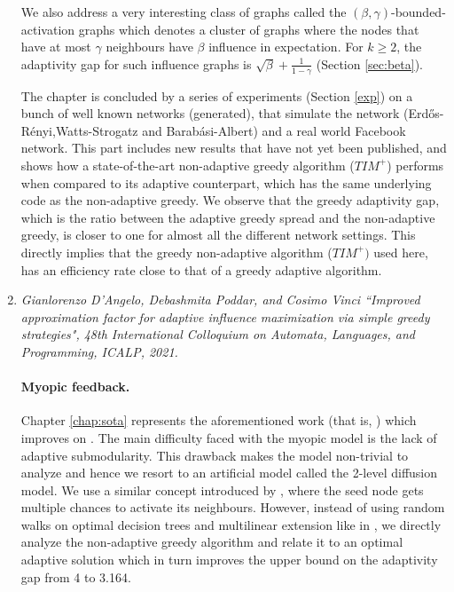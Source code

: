 \begin{enumerate}
We also address a very interesting class of graphs called the $(\beta,\gamma)$-bounded-activation graphs which denotes a cluster of graphs where the nodes that have at most $\gamma$ neighbours have $\beta$ influence in expectation. For $k \geq 2$, the adaptivity gap for such influence graphs is $\sqrt{\beta}+\frac{1}{1-\gamma}$ (Section \ref{sec:beta}).

The chapter is concluded by a series of experiments (Section \ref{exp}) on a bunch of well known networks (generated), that simulate the network (Erdős-Rényi,Watts-Strogatz and Barabási-Albert) and a real world Facebook network. This part includes new results that have not yet been published, and shows how a state-of-the-art non-adaptive greedy algorithm ($TIM^+$) performs when compared to its adaptive counterpart, which has the same underlying code as the non-adaptive greedy. We observe that the greedy adaptivity gap, which is the ratio between the adaptive greedy spread and the non-adaptive greedy, is closer to one for almost all the different network settings. This directly implies that the greedy non-adaptive algorithm ($TIM^+)$ used here, has an efficiency rate close to that of a greedy adaptive algorithm.




 
 \item  \textit{Gianlorenzo D’Angelo, Debashmita Poddar, and Cosimo Vinci ``Improved approximation factor for adaptive influence maximization via simple greedy strategies", 48th International Colloquium on Automata, Languages, and Programming, ICALP, 2021.}



\paragraph{Myopic feedback.} 


Chapter \ref{chap:sota} represents the aforementioned work (that is, \cite{DAngeloPV21}) which improves on \cite{Chen2019a}. The main difficulty faced with the myopic model is the lack of adaptive submodularity. This drawback makes the model non-trivial to analyze and hence we resort to an artificial model called the 2-level diffusion model. We use a similar concept introduced by \cite{Chen2019a}, where the seed node gets multiple chances to activate its neighbours. However, instead of using random walks on optimal decision trees and multilinear extension like in \cite{Chen2019a}, we directly analyze the non-adaptive greedy algorithm and relate it to an optimal adaptive solution which in turn improves the upper bound on the adaptivity gap from 4 to 3.164.


\end{enumerate}
